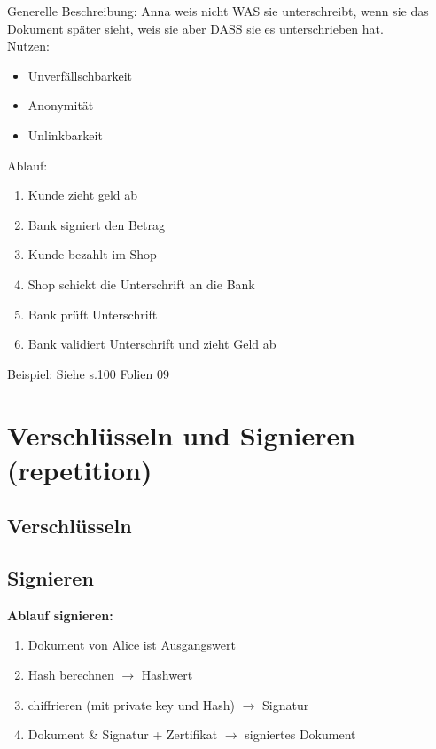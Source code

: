 \documentclass[12pt]{scrartcl}
\begin{document}
Generelle Beschreibung: Anna weis nicht WAS sie unterschreibt, wenn sie das Dokument später sieht,
weis sie aber DASS sie es unterschrieben hat.\\
Nutzen:
\begin{itemize}
    \item Unverfällschbarkeit
    \item Anonymität
    \item Unlinkbarkeit
\end{itemize}

\vspace{0.5cm}
\noindent
Ablauf:
\label{sec:dinimam}
\begin{enumerate}
    \item Kunde zieht geld ab
    \item Bank signiert den Betrag
    \item Kunde bezahlt im Shop
    \item Shop schickt die Unterschrift an die Bank
    \item Bank prüft Unterschrift
    \item Bank validiert Unterschrift und zieht Geld ab
\end{enumerate}

\vspace{0.5cm}
Beispiel: Siehe s.100 Folien 09


\section{Verschlüsseln und Signieren (repetition)}


\subsection{Verschlüsseln}

\subsection{Signieren}

\textbf{Ablauf signieren:}

\begin{enumerate}
    \item Dokument von Alice ist Ausgangswert
    \item Hash berechnen $\rightarrow$ Hashwert
    \item chiffrieren (mit private key und Hash) $\rightarrow$ Signatur
    \item Dokument \& Signatur + Zertifikat $\rightarrow$ signiertes Dokument
\end{enumerate}
\end{document}
